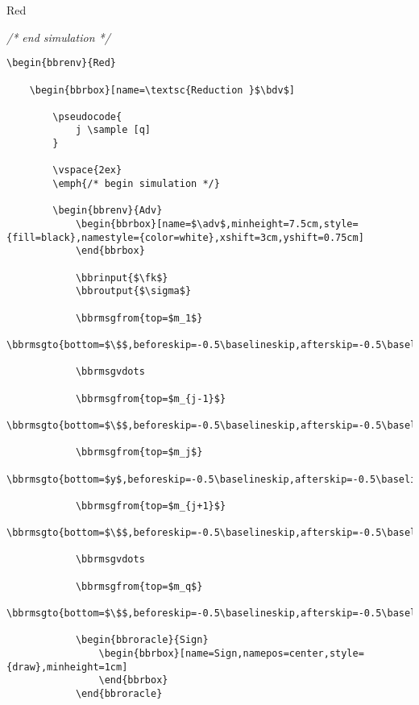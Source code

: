 \documentclass[a4paper]{report}
\begin{document}
\begin{bbrenv}{Red}
\begin{bbrbox}[name=\textsc{Reduction }$\bdv$]
		\vspace{-3ex}
		\emph{/* end simulation */}
		

	\end{bbrbox}
\end{bbrenv}

\begin{lstlisting}
\begin{bbrenv}{Red}

	\begin{bbrbox}[name=\textsc{Reduction }$\bdv$]

		\pseudocode{
			j \sample [q] 
		}
		
		\vspace{2ex}
		\emph{/* begin simulation */}
		
		\begin{bbrenv}{Adv}
			\begin{bbrbox}[name=$\adv$,minheight=7.5cm,style={fill=black},namestyle={color=white},xshift=3cm,yshift=0.75cm]
			\end{bbrbox}

			\bbrinput{$\fk$}
			\bbroutput{$\sigma$}			
			
			\bbrmsgfrom{top=$m_1$}
			\bbrmsgto{bottom=$\$$,beforeskip=-0.5\baselineskip,afterskip=-0.5\baselineskip}
			
			\bbrmsgvdots
			
			\bbrmsgfrom{top=$m_{j-1}$}
			\bbrmsgto{bottom=$\$$,beforeskip=-0.5\baselineskip,afterskip=-0.5\baselineskip}
			
			\bbrmsgfrom{top=$m_j$}
			\bbrmsgto{bottom=$y$,beforeskip=-0.5\baselineskip,afterskip=-0.5\baselineskip}

			\bbrmsgfrom{top=$m_{j+1}$}
			\bbrmsgto{bottom=$\$$,beforeskip=-0.5\baselineskip,afterskip=-0.5\baselineskip}

			\bbrmsgvdots
			
			\bbrmsgfrom{top=$m_q$}
			\bbrmsgto{bottom=$\$$,beforeskip=-0.5\baselineskip,afterskip=-0.5\baselineskip}

			\begin{bbroracle}{Sign}
				\begin{bbrbox}[name=Sign,namepos=center,style={draw},minheight=1cm]
				\end{bbrbox}
			\end{bbroracle}


\end{lstlisting}
\end{document}

